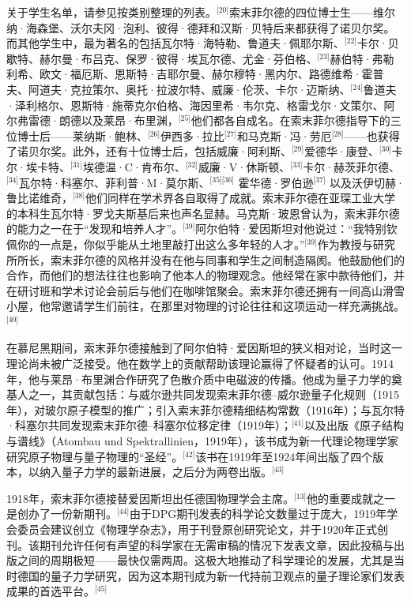 关于学生名单，请参见按类别整理的列表。\(^\text{[20]}\)索末菲尔德的四位博士生——维尔纳·海森堡、沃尔夫冈·泡利、彼得·德拜和汉斯·贝特后来都获得了诺贝尔奖。而其他学生中，最为著名的包括瓦尔特·海特勒、鲁道夫·佩耶尔斯、\(^\text{[22]}\)卡尔·贝歇特、赫尔曼·布吕克、保罗·彼得·埃瓦尔德、尤金·芬伯格、\(^\text{[23]}\)赫伯特·弗勒利希、欧文·福厄斯、恩斯特·吉耶尔曼、赫尔穆特·黑内尔、路德维希·霍普夫、阿道夫·克拉策尔、奥托·拉波尔特、威廉·伦茨、卡尔·迈斯纳、\(^\text{[24]}\)鲁道夫·泽利格尔、恩斯特·施蒂克尔伯格、海因里希·韦尔克、格雷戈尔·文策尔、阿尔弗雷德·朗德以及莱昂·布里渊，\(^\text{[25]}\)他们都各自成名。在索末菲尔德指导下的三位博士后——莱纳斯·鲍林、\(^\text{[26]}\)伊西多·拉比\(^\text{[27]}\)和马克斯·冯·劳厄\(^\text{[28]}\)——也获得了诺贝尔奖。此外，还有十位博士后，包括威廉·阿利斯、\(^\text{[29]}\)爱德华·康登、\(^\text{[30]}\)卡尔·埃卡特、\(^\text{[31]}\)埃德温·C·肯布尔、\(^\text{[32]}\)威廉·V·休斯顿、\(^\text{[33]}\)卡尔·赫茨菲尔德、\(^\text{[34]}\)瓦尔特·科塞尔、菲利普·M·莫尔斯、\(^\text{[35][36]}\) 霍华德·罗伯逊\(^\text{[37]}\) 以及沃伊切赫·鲁比诺维奇，\(^\text{[38]}\)他们同样在学术界各自取得了成就。索末菲尔德在亚琛工业大学的本科生瓦尔特·罗戈夫斯基后来也声名显赫。马克斯·玻恩曾认为，索末菲尔德的能力之一在于“发现和培养人才”。\(^\text{[39]}\)阿尔伯特·爱因斯坦对他说过：“我特别钦佩你的一点是，你似乎能从土地里敲打出这么多年轻的人才。”\(^\text{[39]}\)作为教授与研究所所长，索末菲尔德的风格并没有在他与同事和学生之间制造隔阂。他鼓励他们的合作，而他们的想法往往也影响了他本人的物理观念。他经常在家中款待他们，并在研讨班和学术讨论会前后与他们在咖啡馆聚会。索末菲尔德还拥有一间高山滑雪小屋，他常邀请学生们前往，在那里对物理的讨论往往和这项运动一样充满挑战。\(^\text{[40]}\)

在慕尼黑期间，索末菲尔德接触到了阿尔伯特·爱因斯坦的狭义相对论，当时这一理论尚未被广泛接受。他在数学上的贡献帮助该理论赢得了怀疑者的认可。1914年，他与莱昂·布里渊合作研究了色散介质中电磁波的传播。他成为量子力学的奠基人之一，其贡献包括：与威尔逊共同发现索末菲尔德–威尔逊量子化规则（1915年），对玻尔原子模型的推广；引入索末菲尔德精细结构常数（1916年）；与瓦尔特·科塞尔共同发现索末菲尔德–科塞尔位移定律（1919年）；\(^\text{[41]}\)以及出版《原子结构与谱线》（Atombau und Spektrallinien，1919年），该书成为新一代理论物理学家研究原子物理与量子物理的“圣经”。\(^\text{[42]}\)该书在1919年至1924年间出版了四个版本，以纳入量子力学的最新进展，之后分为两卷出版。\(^\text{[43]}\)

1918年，索末菲尔德接替爱因斯坦出任德国物理学会主席。\(^\text{[13]}\)他的重要成就之一是创办了一份新期刊。\(^\text{[44]}\)由于DPG期刊发表的科学论文数量过于庞大，1919年学会委员会建议创立《物理学杂志》，用于刊登原创研究论文，并于1920年正式创刊。该期刊允许任何有声望的科学家在无需审稿的情况下发表文章，因此投稿与出版之间的周期极短——最快仅需两周。这极大地推动了科学理论的发展，尤其是当时德国的量子力学研究，因为这本期刊成为新一代持前卫观点的量子理论家们发表成果的首选平台。\(^\text{[45]}\)

